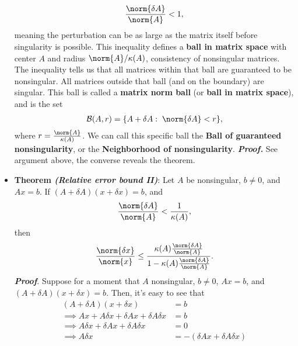 \documentclass{report}
\begin{document}
\begin{itemize}
        \begin{align*}
            \frac{\norm{\delta  A}}{\norm{ A}} < 1,
        \end{align*}
        meaning the perturbation can be as large as the matrix itself before singularity is possible.
        \bigbreak \noindent 
        This inequality defines a \textbf{ball in matrix space} with center $A$ and radius $\norm{A} / \kappa(A)$, consistency of nonsingular matrices. The inequality tells us that all matrices within that ball are guaranteed to be nonsingular. All matrices outside that ball (and on the boundary) are singular.
        \bigbreak \noindent 
        This ball is called a \textbf{matrix norm ball} (or \textbf{ball in matrix space}), and is the set
        \begin{align*}
            \mathcal{B}(A,r) = \{A + \delta  A:\; \norm{\delta A} < r\},
        \end{align*}
        where $r = \frac{\norm{A}}{\kappa(A)} $. We can call this specific ball the \textbf{Ball of guaranteed nonsingularity}, or the \textbf{Neighborhood of nonsingularity}.
        \bigbreak \noindent 
        \textbf{\textit{Proof.}} See argument above, the converse reveals the theorem.
    \item \textbf{Theorem \textit{(Relative error bound II)}}: Let $A$ be nonsingular, $b\ne 0$, and $Ax=b$. If $(A + \delta A)(x + \delta x) = b$, and 
        \begin{align*}
            \frac{\norm{\delta  A}}{\norm{A}} < \frac{1}{\kappa(A)},
        \end{align*}
        then
        \begin{align*}
            \frac{\norm{\delta x}}{\norm{x}} \leq \frac{\kappa(A)\frac{\norm{\delta A}}{\norm{A}}}{1-\kappa(A)\frac{\norm{\delta A}}{\norm{A}}}
        .\end{align*}
        \bigbreak \noindent 
        \textbf{\textit{Proof}}. Suppose for a moment that $A$ nonsingular, $b \ne 0$,  $ Ax = b$, and $(A + \delta A)(x + \delta  x) = b$. Then, it's easy to see that
        \begin{align*}
            (A + \delta A)(x + \delta x) &= b \\
            \implies Ax + A\delta x + \delta  A x + \delta A \delta x &= b \\
            \implies A \delta x + \delta A x + \delta A \delta x &=0 \\
            \implies A \delta x &= - \left(\delta Ax + \delta A \delta x\right) \\

\end{align*}
\end{itemize}
\end{document}
